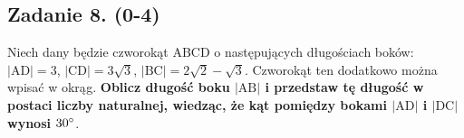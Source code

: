 \subsection*{Zadanie 8. (0-4)}
Niech dany będzie czworokąt $\mathrm{ABCD}$ o następujących długościach boków: $|\mathrm{AD}|=3$, $|\mathrm{CD}|=3\sqrt{3}$, $|\mathrm{BC}|=2\sqrt{2}-\sqrt{3}$. Czworokąt ten dodatkowo można wpisać w okrąg. \textbf{Oblicz długość boku $|\mathrm{AB}|$ i przedstaw tę długość w postaci liczby naturalnej, wiedząc, że kąt pomiędzy bokami $|\mathrm{AD}|$ i $|\mathrm{DC}|$ wynosi $30\degree$}.